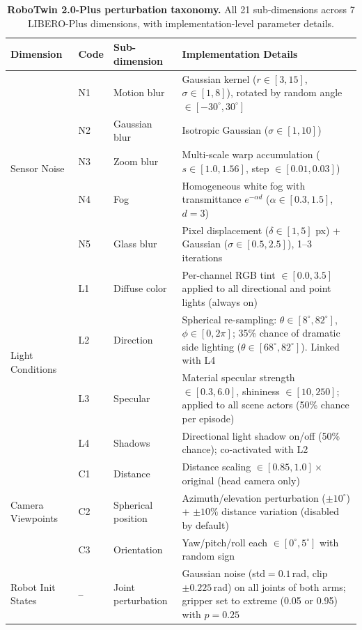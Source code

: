 \documentclass{article}
\begin{document}
\begin{table}[h]
\caption{\textbf{RoboTwin 2.0-Plus perturbation taxonomy.} All 21 sub-dimensions across 7 LIBERO-Plus dimensions, with implementation-level parameter details.}
\label{tab:perturbation_taxonomy}
\centering
\small
\begin{tabular}{@{}lllp{7.2cm}@{}}
\toprule
\textbf{Dimension} & \textbf{Code} & \textbf{Sub-dimension} & \textbf{Implementation Details} \\ \midrule
\multirow{5}{*}{Sensor Noise}
  & N1 & Motion blur & Gaussian kernel ($r \in [3,15]$, $\sigma \in [1,8]$), rotated by random angle $\in [-30^\circ, 30^\circ]$ \\
  & N2 & Gaussian blur & Isotropic Gaussian ($\sigma \in [1, 10]$) \\
  & N3 & Zoom blur & Multi-scale warp accumulation ($s \in [1.0, 1.56]$, step $\in [0.01, 0.03]$) \\
  & N4 & Fog & Homogeneous white fog with transmittance $e^{-\alpha d}$ ($\alpha \in [0.3, 1.5]$, $d{=}3$) \\
  & N5 & Glass blur & Pixel displacement ($\delta \in [1, 5]$ px) + Gaussian ($\sigma \in [0.5, 2.5]$), 1--3 iterations \\ \midrule
\multirow{4}{*}{Light Conditions}
  & L1 & Diffuse color & Per-channel RGB tint $\in [0.0, 3.5]$ applied to all directional and point lights (always on) \\
  & L2 & Direction & Spherical re-sampling: $\theta \in [8^\circ, 82^\circ]$, $\phi \in [0, 2\pi]$; 35\% chance of dramatic side lighting ($\theta \in [68^\circ, 82^\circ]$). Linked with L4 \\
  & L3 & Specular & Material specular strength $\in [0.3, 6.0]$, shininess $\in [10, 250]$; applied to all scene actors (50\% chance per episode) \\
  & L4 & Shadows & Directional light shadow on/off (50\% chance); co-activated with L2 \\ \midrule
\multirow{3}{*}{Camera Viewpoints}
  & C1 & Distance & Distance scaling $\in [0.85, 1.0]\times$ original (head camera only) \\
  & C2 & Spherical position & Azimuth/elevation perturbation ($\pm 10^\circ$) + $\pm 10\%$ distance variation (disabled by default) \\
  & C3 & Orientation & Yaw/pitch/roll each $\in [0^\circ, 5^\circ]$ with random sign \\ \midrule
Robot Init States & -- & Joint perturbation & Gaussian noise (std${}=0.1$\,rad, clip $\pm 0.225$\,rad) on all joints of both arms; gripper set to extreme (0.05 or 0.95) with $p{=}0.25$ \\ \midrule

\end{tabular}
\end{table}
\end{document}

